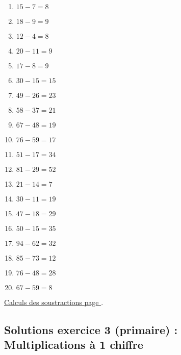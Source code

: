 \begin{enumerate}[label=S\arabic*)]
    \item \(15 - 7 = 8 \)
    \item \(18 - 9 = 9 \)
    \item \(12 - 4 = 8 \)
    \item \(20 - 11 = 9 \)
    \item \(17 - 8 = 9 \)
    \item \(30 - 15 = 15 \)
    \item \(49 - 26 = 23 \)
    \item \(58 - 37 = 21 \)
    \item \(67 - 48 = 19 \)
    \item \(76 - 59 = 17\)
    \item \(51 - 17 = 34\)
    \item \(81 - 29 = 52\)
    \item \(21 - 14 = 7\)
    \item \(30 - 11 = 19\)
    \item \(47 - 18 = 29\)
    \item \(50 - 15 = 35\)
    \item \(94 - 62 = 32\)
    \item \(85 - 73 = 12\)
    \item \(76 - 48 = 28\)
    \item \(67 - 59 = 8\)
\end{enumerate}


\hyperref[calc:niveau2]{Calculs des soustractions page \pageref{calc:niveau2}}.


\newpage 


\subsection{Solutions exercice 3 (primaire) : Multiplications à 1 chiffre}

\label{sol:niveau3}

